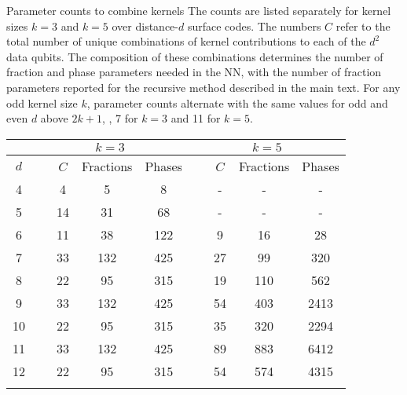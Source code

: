 \begin{table}[htbp]
\centering
\ccaption
{Parameter counts to combine kernels}
{The counts are listed separately for kernel sizes $k=3$ and $k=5$ over distance-$d$ surface codes. The numbers $C$ refer to the total number of unique combinations of kernel contributions to each of the $d^2$ data qubits. The composition of these combinations determines the number of fraction and phase parameters needed in the NN, with the number of fraction parameters reported for the recursive method described in the main text. For any odd kernel size $k$, parameter counts alternate with the same values for odd and even $d$ above $2k+1$, \ie, 7 for $k=3$ and 11 for $k=5$.}
\renewcommand{\arraystretch}{1.25}
\begin{tabular}{c ccc ccc}
\hline
      & \multicolumn{3}{c}{$k=3$} & \multicolumn{3}{c}{$k=5$} \\
\hline
$d$ & ~~~$C$ & Fractions & Phases & ~~~$C$ & Fractions & Phases  \\
\hline
4 & ~~~4 & 5 & 8 & ~~~- & - & - \\
5 & ~~~14 & 31 & 68 & ~~~- & - & - \\
6 & ~~~11 & 38 & 122 & ~~~9 & 16 & 28 \\
7 & ~~~33 & 132 & 425 & ~~~27 & 99 & 320 \\
8 & ~~~22 & 95 & 315 & ~~~19 & 110 & 562 \\
9 & ~~~33 & 132 & 425 & ~~~54 & 403 & 2413 \\
10 & ~~~22 & 95 & 315 & ~~~35 & 320 & 2294 \\
11 & ~~~33 & 132 & 425 & ~~~89 & 883 & 6412 \\
12 & ~~~22 & 95 & 315 & ~~~54 & 574 & 4315 \\
\hline
\label{table:unique-kern-contribs}
\end{tabular}
\end{table}



